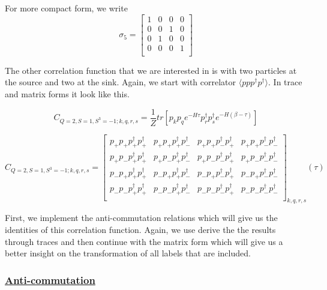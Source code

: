 For more compact form, we write
\\
\begin{equation*}
 \sigma_5 = \left[ {\begin{array}{cccc}
    1 & 0 & 0 & 0 \\
    0 & 0 & 1 & 0 \\
    0 & 1 & 0 & 0 \\
    0 & 0 & 0 & 1 \\
  \end{array} } \right]
\end{equation*}


The other correlation function that we are interested in is with two particles at the source and two at the sink. Again, we start with correlator $\langle ppp^\dagger p^\dagger\rangle$. In trace and matrix forms it look like this.

\begin{equation*}
  C_{Q=2,S=1,S^3=-1;k,q,r,s} = \frac{1}{Z}tr\left[p_kp_qe^{-H\tau}p^\dagger_rp^\dagger_se^{-H\left(\beta-\tau\right)}\right]
\end{equation*}

\renewcommand{\cor}[4]{p_{#1}p_{#2}p^\dagger_{#3}p^\dagger_{#4}}
\begin{equation*}
  C_{Q=2,S=1,S^3=-1;k,q,r,s} =
  \left[
  \begin{array}{cccc}
    \cor{+}{+}{+}{+} & \cor{+}{+}{+}{-} & \cor{+}{+}{-}{+} & \cor{+}{+}{-}{-} \\
    \cor{+}{-}{+}{+} & \cor{+}{-}{+}{-} & \cor{+}{-}{-}{+} & \cor{+}{-}{-}{-} \\
    \cor{-}{+}{+}{+} & \cor{-}{+}{+}{-} & \cor{-}{+}{-}{+} & \cor{-}{+}{-}{-} \\
    \cor{-}{-}{+}{+} & \cor{-}{-}{+}{-} & \cor{-}{-}{-}{+} & \cor{-}{-}{-}{-} \\
  \end{array}
  \right]_{k,q,r,s} (\tau)
\end{equation*}

First, we implement the anti-commutation relations which will give us the identities of this correlation function. Again, we use derive the the results through traces and then continue with the matrix form which will give us a better insight on the transformation of all labels that are included.

\subsubsection{\underline{Anti-commutation}}


